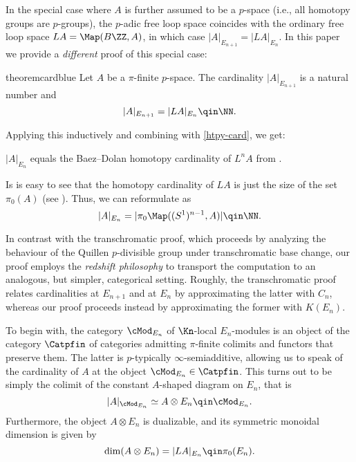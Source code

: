 \documentclass[english]{article}
\begin{document}
In the special case where $A$ is further assumed to be a $p$-space (i.e., all homotopy groups are $p$-groups), the $p$-adic free loop space coincides with the ordinary free loop space $LA = \Map(B\ZZ,A)$, in which case $|A|_{E_{n+1}} = |LA|_{E_n}$. In this paper we provide a \textit{different} proof of this special case:

\begin{restatable}{theorem}{cardblue}\label{card-blue}
    Let $A$ be a $\pi$-finite $p$-space. The cardinality $|A|_{E_{n+1}}$ is a natural number and
    \[
        |A|_{E_{n+1}} = |LA|_{E_n} \qin \NN.
    \]
\end{restatable}

Applying this inductively and combining with \cref{htpy-card}, we get:

\begin{cor}\label{card-to-0}
    $|A|_{E_n}$ equals the Baez--Dolan homotopy cardinality of $L^nA$ from .
\end{cor}

\begin{rem}
    Is is easy to see that the homotopy cardinality of $LA$ is just the size of the set $\pi_0(A)$ (see \cite[Proposition 2.15]{yanovski2023homotopy}). Thus, we can reformulate  as
    \[
        |A|_{E_n} = 
        |\pi_0 \Map((S^1)^{n-1},A)| \qin 
        \NN.
    \]
\end{rem}

In contrast with the transchromatic proof, which proceeds by analyzing the behaviour of the Quillen $p$-divisible group under transchromatic base change, our proof employs the \textit{redshift philosophy} to transport the computation to an analogous, but simpler, categorical setting. Roughly, the transchromatic proof relates cardinalities at $E_{n+1}$ and at $E_n$ by approximating the latter with $C_n$, whereas our proof proceeds instead by approximating the former with $K(E_n)$.

To begin with, the category $\cMod_{E_n}$ of $\Kn$-local $E_n$-modules is an object of the category $\Catpfin$ of categories admitting $\pi$-finite colimits and functors that preserve them. 
The latter is $p$-typically $\infty$-semiadditive, allowing us to speak of the cardinality of $A$ at the object $\cMod_{E_n} \in \Catpfin$. This turns out to be simply the colimit of the constant $A$-shaped diagram on $E_n$, that is
\[
    |A|_{\cMod_{E_n}} \simeq A \otimes E_n
    \qin \cMod_{E_n}.
\]
Furthermore, the object $A\otimes E_n$ is dualizable, and its symmetric monoidal dimension is given by
\[
    \dim(A \otimes E_n) = |LA|_{E_n}
    \qin \pi_0(E_n).
\]
\end{document}

